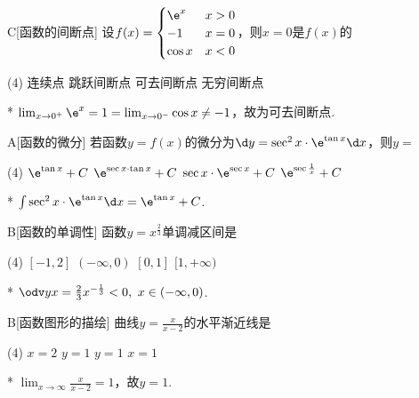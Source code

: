 \begin{choice}{C}[函数的间断点]
    设$f(x)=\begin{cases}
        \e^x & x>0\\
        -1 & x=0\\
        \cos x & x<0
    \end{cases}$，则$x=0$是$f(x)$的
\begin{tasks}(4)
    \task 连续点
    \task 跳跃间断点
    \task 可去间断点
    \task 无穷间断点
\end{tasks}
\end{choice}
\begin{solution}*
    $\lim_{x\to 0^+}\e^x=1=\lim_{x\to 0^-}\cos x\neq -1$，故为可去间断点.
\end{solution}

\begin{choice}{A}[函数的微分]
    若函数$y=f(x)$的微分为$\d y=\sec^2x\cdot\e^{\tan x}\d x$，则$y=$
\begin{tasks}(4)
    \task $\e^{\tan x}+C$
    \task $\e^{\sec x\cdot\tan x}+C$
    \task $\sec x\cdot\e^{\sec x}+C$
    \task $\e^{\sec\frac1x}+C$
\end{tasks}
\end{choice}
\begin{solution}*
    $\int\sec^2x\cdot\e^{\tan x}\d x=\e^{\tan x}+C$.
\end{solution}

\begin{choice}{B}[函数的单调性]
    函数$y=x^{\frac23}$单调减区间是
\begin{tasks}(4)
    \task $[-1,2]$
    \task $(-\infty,0)$
    \task $[0,1]$
    \task $[1,+\infty)$
\end{tasks}
\end{choice}
\begin{solution}*
    $\odv yx=\frac23x^{-\frac13}<0,\ x\in(-\infty,0)$.
\end{solution}

\begin{choice}{B}[函数图形的描绘]
    曲线$y=\frac{x}{x-2}$的水平渐近线是
\begin{tasks}(4)
    \task $x=2$
    \task $y=1$
    \task $y=1$
    \task $x=1$
\end{tasks}
\end{choice}
\begin{solution}*
    $\lim_{x\to\infty}\frac{x}{x-2}=1$，故$y=1$.
\end{solution}

